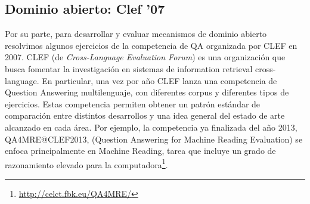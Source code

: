 \subsection{Dominio abierto: Clef '07}
\label{subsec:clef07}
Por su parte, para desarrollar y evaluar mecanismos de dominio abierto resolvimos algunos ejercicios de la competencia de QA organizada por CLEF 
en 2007. 
CLEF (de \textit{Cross-Language Evaluation Forum}) es una organización que busca fomentar la investigación en sistemas de information retrieval cross-language. 
En particular, una vez por año CLEF lanza una competencia de Question Answering multilenguaje, con diferentes corpus y diferentes tipos de ejercicios. Estas competencia permiten obtener un patrón estándar de comparación entre distintos desarrollos y una idea general del estado de arte alcanzado en cada área.
Por ejemplo, la competencia ya finalizada del año 2013, QA4MRE@CLEF2013, (Question Answering for Machine Reading Evaluation) se enfoca principalmente en Machine Reading, tarea que incluye un grado de razonamiento elevado para la computadora\footnote{\url{http://celct.fbk.eu/QA4MRE/}}.

